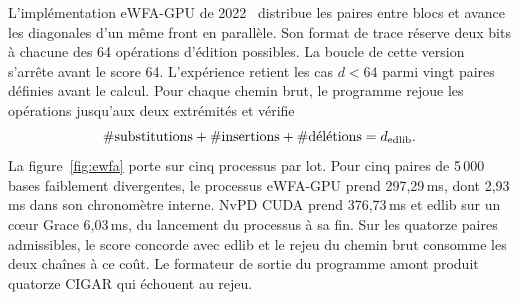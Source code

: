 L'implémentation eWFA-GPU de 2022~\cite{wfagpu} distribue les paires entre blocs et avance les diagonales d'un même front en parallèle. Son format de trace réserve deux bits à chacune des 64 opérations d'édition possibles. La boucle de cette version s'arrête avant le score 64. L'expérience retient les cas \(d<64\) parmi vingt paires définies avant le calcul. Pour chaque chemin brut, le programme rejoue les opérations jusqu'aux deux extrémités et vérifie
\[
 \#\text{substitutions}+\#\text{insertions}+\#\text{délétions}=d_{\rm edlib}.
\]
La figure~\ref{fig:ewfa} porte sur cinq processus par lot. Pour cinq paires de 5\,000 bases faiblement divergentes, le processus eWFA-GPU prend 297,29\,ms, dont 2,93\,ms dans son chronomètre interne. NvPD CUDA prend 376,73\,ms et edlib sur un cœur Grace 6,03\,ms, du lancement du processus à sa fin. Sur les quatorze paires admissibles, le score concorde avec edlib et le rejeu du chemin brut consomme les deux chaînes à ce coût. Le formateur de sortie du programme amont produit quatorze CIGAR qui échouent au rejeu.
